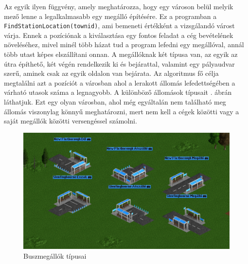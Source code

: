 Az egyik ilyen függvény, amely meghatározza, hogy egy városon belül melyik mező lenne a legalkalmasabb egy megálló építésére. Ez a programban a \\ \texttt{FindStationLocation(townid)}, ami bemeneti értékként a vizsgálandó várost várja. Ennek a pozíciónak a kiválasztása egy fontos feladat a cég bevételének növeléséhez, mivel minél több házat tud a program lefedni egy megállóval, annál több utast képes elszállítani onnan. A megállóknak két típusa van, az egyik az útra építhető, két végén rendelkezik ki és bejárattal, valamint egy pályaudvar szerű, aminek csak az egyik oldalon van bejárata. Az algoritmus fő célja megtalálni azt a pozíciót a városban ahol a lerakott állomás lefedettségében a várható utasok száma a legnagyobb. A különböző állomások típusait . ábrán láthatjuk. Ezt egy olyan városban, ahol még egyáltalán nem található meg állomás viszonylag könnyű meghatározni, mert nem kell a cégek közötti vagy a saját megállók közötti versengéssel számolni.

\begin{figure}
	\centering
	\includegraphics[width=\textwidth]{images/megallok.png}
	\caption{Buszmegállók típusai}
	\label{fig:megallok}
\end{figure}

